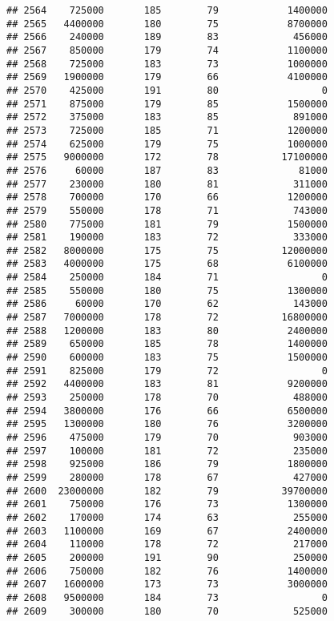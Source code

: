 \documentclass[
]{article}
\begin{document}
\begin{verbatim}
## 2564    725000       185        79            1400000
## 2565   4400000       180        75            8700000
## 2566    240000       189        83             456000
## 2567    850000       179        74            1100000
## 2568    725000       183        73            1000000
## 2569   1900000       179        66            4100000
## 2570    425000       191        80                  0
## 2571    875000       179        85            1500000
## 2572    375000       183        85             891000
## 2573    725000       185        71            1200000
## 2574    625000       179        75            1000000
## 2575   9000000       172        78           17100000
## 2576     60000       187        83              81000
## 2577    230000       180        81             311000
## 2578    700000       170        66            1200000
## 2579    550000       178        71             743000
## 2580    775000       181        79            1500000
## 2581    190000       183        72             333000
## 2582   8000000       175        75           12000000
## 2583   4000000       175        68            6100000
## 2584    250000       184        71                  0
## 2585    550000       180        75            1300000
## 2586     60000       170        62             143000
## 2587   7000000       178        72           16800000
## 2588   1200000       183        80            2400000
## 2589    650000       185        78            1400000
## 2590    600000       183        75            1500000
## 2591    825000       179        72                  0
## 2592   4400000       183        81            9200000
## 2593    250000       178        70             488000
## 2594   3800000       176        66            6500000
## 2595   1300000       180        76            3200000
## 2596    475000       179        70             903000
## 2597    100000       181        72             235000
## 2598    925000       186        79            1800000
## 2599    280000       178        67             427000
## 2600  23000000       182        79           39700000
## 2601    750000       176        73            1300000
## 2602    170000       174        63             255000
## 2603   1100000       169        67            2400000
## 2604    110000       178        72             217000
## 2605    200000       191        90             250000
## 2606    750000       182        76            1400000
## 2607   1600000       173        73            3000000
## 2608   9500000       184        73                  0
## 2609    300000       180        70             525000

\end{verbatim}
\end{document}
